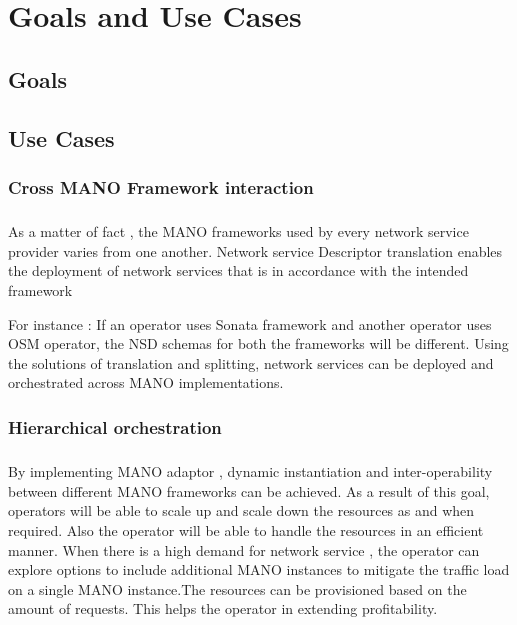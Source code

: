 \chapter{Goals and Use Cases}
\label{ch:Goals and Use Cases}


\section{Goals}

\section{Use Cases}

 
\subsection{Cross MANO Framework interaction}
\paragraph{}

As a matter of fact , the MANO frameworks used by every network service provider varies from one another. 
Network service Descriptor translation enables the deployment of network services that is in accordance with the intended framework

For instance : If an operator uses Sonata framework and another operator uses OSM operator, the NSD schemas for both the frameworks will be different. Using the solutions of translation and splitting, network services can be deployed and orchestrated across MANO implementations.

\subsection{Hierarchical orchestration}
\paragraph{}
By implementing MANO adaptor , dynamic instantiation and inter-operability between different MANO frameworks 
can be achieved. As a result of this goal, operators will be able to scale up and scale down the resources as and when required. Also the operator will be able to handle the resources in an efficient manner. 
When there is a high demand for network service , the operator can explore options to include additional MANO instances to mitigate the traffic load on a single MANO instance.The resources can be provisioned based on the amount of requests. This helps the operator in extending profitability. 

